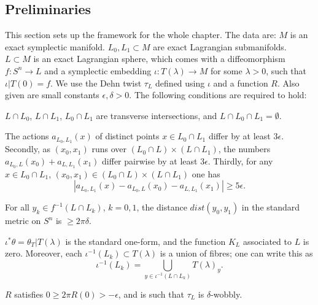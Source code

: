 \documentclass[10pt,letterpaper]{article}
\begin{document}
\subsection{Preliminaries\label{sec:setup}}

This section sets up the framework for the whole chapter. The data are: $M$ is
an exact symplectic manifold. $L_0,L_1 \subset M$ are exact Lagrangian
submanifolds. $L \subset M$ is an exact Lagrangian sphere, which comes with a
diffeomorphism $f: S^n \rightarrow L$ and a symplectic embedding $\iota:
T(\lambda) \rightarrow M$ for some $\lambda>0$, such that $\iota|T(0) = f$. We
use the Dehn twist $\tau_L$ defined using $\iota$ and a function $R$. Also
given are small constants $\epsilon,\delta>0$. The following conditions are
required to hold:
\begin{Romanlist}
\item \label{cond:transverse}
$L \cap L_0$, $L \cap L_1$, $L_0 \cap L_1$ are transverse intersections, and $L
\cap L_0 \cap L_1 = \emptyset$.
\item \label{cond:action}
The actions $a_{L_0,L_1}(x)$ of distinct points $x \in L_0 \cap L_1$ differ by
at least $3\epsilon$. Secondly, as $({x}_0,x_1)$ runs over $(L_0 \cap L) \times
(L \cap L_1)$, the numbers $a_{L_0,L}({x}_0) + a_{L,L_1}(x_1)$ differ pairwise
by at least $3\epsilon$. Thirdly, for any $x \in L_0 \cap L_1$, $({x}_0,x_1)
\in (L_0 \cap L) \times (L \cap L_1)$ one has
\[
|a_{L_0,L_1}(x) - a_{L_0,L}({x}_0) - a_{L,L_1}(x_1)| \geq 5 \epsilon.
\]
\item \label{cond:distance}
For all $y_k \in f^{-1}(L \cap L_k)$, $k = 0,1$, the distance $dist({y}_0,y_1)$
in the standard metric on $S^n$ is $\geq 2\pi\delta$.
\item \label{cond:local}
$\iota^*\theta = \theta_T|T(\lambda)$ is the standard one-form, and the
function $K_L$ associated to $L$ is zero. Moreover, each $\iota^{-1}(L_k)
\subset T(\lambda)$ is a union of fibres; one can write this as
\begin{equation} \label{eq:union-of-fibres}
\iota^{-1}(L_k) = \bigcup_{y \in \iota^{-1}(L \cap L_k)} T(\lambda)_y.
\end{equation}
\item \label{cond:wobbly}
$R$ satisfies $0 \geq 2\pi R(0) > -\epsilon$, and is such that $\tau_L$ is
$\delta$-wobbly.
\end{Romanlist}
\end{document}
